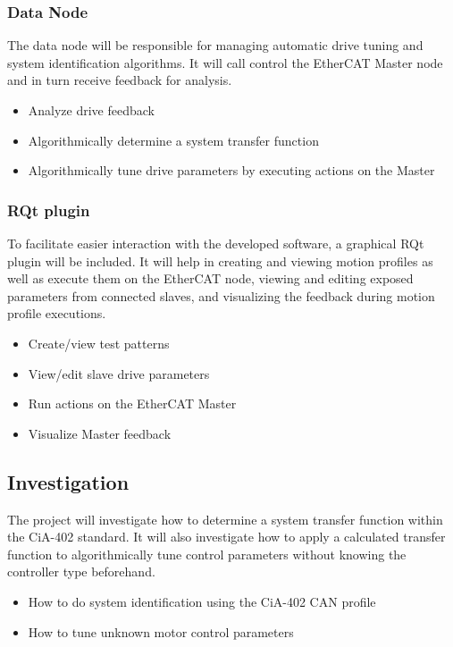 \subsubsection{Data Node}

The data node will be responsible for managing automatic drive tuning and system identification algorithms. 
It will call control the EtherCAT Master node and in turn receive feedback for analysis. 

\begin{itemize}
	\setlength\itemsep{\pdescitemsep}
	\item Analyze drive feedback
	\item Algorithmically determine a system transfer function
	\item Algorithmically tune drive parameters by executing actions on the Master
\end{itemize}

\subsubsection{RQt plugin}

To facilitate easier interaction with the developed software, a graphical RQt plugin will be included. 
It will help in creating and viewing motion profiles as well as execute them on the EtherCAT node, viewing and editing exposed parameters from connected slaves, and visualizing the feedback during motion profile executions. 

\begin{itemize}
	\setlength\itemsep{\pdescitemsep}
	\item Create/view test patterns
	\item View/edit slave drive parameters
	\item Run actions on the EtherCAT Master
	\item Visualize Master feedback
\end{itemize}

\subsection{Investigation}

The project will investigate how to determine a system transfer function within the CiA-402 standard. 
It will also investigate how to apply a calculated transfer function to algorithmically tune control parameters without knowing the controller type beforehand. 

\begin{itemize}
	\setlength\itemsep{\pdescitemsep}
	\item How to do system identification using the CiA-402 CAN profile
	\item How to tune unknown motor control parameters
\end{itemize}

